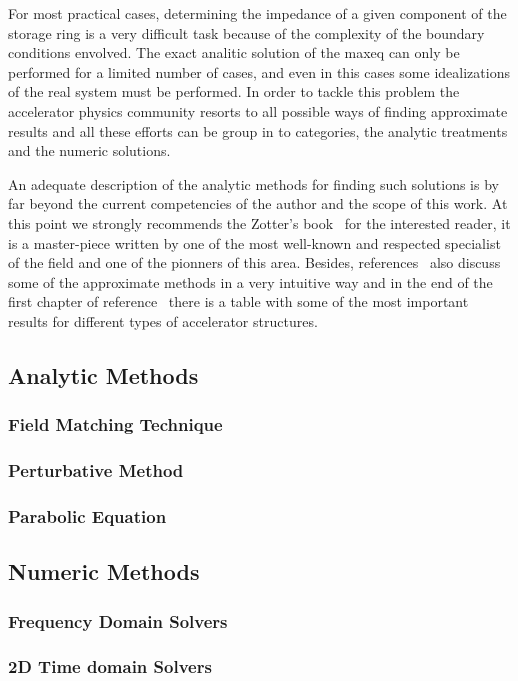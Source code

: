     For most practical cases, determining the impedance of a given component of the storage ring is a very difficult task because of the complexity of the boundary conditions envolved. The exact analitic solution of the \gls{maxeq} can only be performed for a limited number of cases, and even in this cases some idealizations of the real system must be performed. In order to tackle this problem the accelerator physics community resorts to all possible ways of finding approximate results and all these efforts can be group in to categories, the analytic treatments and the numeric solutions.

	An adequate description of the analytic methods for finding such solutions is by far beyond the current competencies of the author and the scope of this work. At this point we strongly recommends the Zotter's book~\cite{Zotter1997} for the interested reader, it is a master-piece written by one of the most well-known and respected specialist of the field and one of the pionners of this area. Besides, references~\cite{chao1993, Palumbo1994} also discuss some of the approximate methods in a very intuitive way and in the end of the first chapter of reference~\cite{Ng2009} there is a table with some of the most important results for different types of accelerator structures.

\subsection{Analytic Methods}
\subsubsection{Field Matching Technique}
\subsubsection{Perturbative Method}
\subsubsection{Parabolic Equation}
\subsection{Numeric Methods}\label{ssec:numeric_methods}
\subsubsection{Frequency Domain Solvers}
\subsubsection{2D Time domain Solvers}
